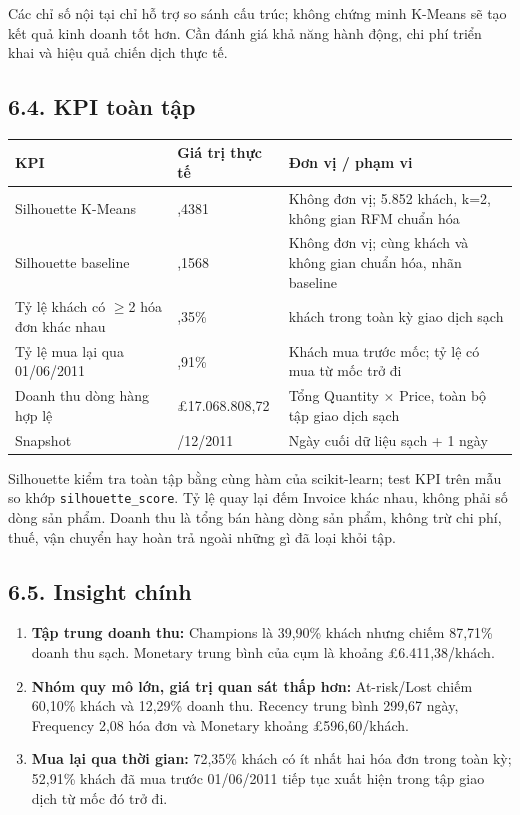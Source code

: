 \documentclass[a4paper]{article}
\begin{document}
Các chỉ số nội tại chỉ hỗ trợ so sánh cấu trúc; không chứng minh K-Means sẽ tạo kết quả kinh doanh tốt hơn. Cần đánh giá khả năng hành động, chi phí triển khai và hiệu quả chiến dịch thực tế.

\subsection*{6.4. KPI toàn tập}

\begin{table}[htbp]
\centering
\small
\begin{tabularx}{\textwidth}{|>{\raggedright\arraybackslash}X|>{\raggedright\arraybackslash}X|>{\raggedright\arraybackslash}X|}
\hline
\textbf{KPI} & \textbf{Giá trị thực tế} & \textbf{Đơn vị / phạm vi} \\
\hline
Silhouette K-Means & 0,4381 & Không đơn vị; 5.852 khách, k=2, không gian RFM chuẩn hóa \\
\hline
Silhouette baseline & 0,1568 & Không đơn vị; cùng khách và không gian chuẩn hóa, nhãn baseline \\
\hline
Tỷ lệ khách có \ensuremath{\geq}2 hóa đơn khác nhau & 72,35\% & 5.852 khách trong toàn kỳ giao dịch sạch \\
\hline
Tỷ lệ mua lại qua 01/06/2011 & 52,91\% & Khách mua trước mốc; tỷ lệ có mua từ mốc trở đi \\
\hline
Doanh thu dòng hàng hợp lệ & \pounds{}17.068.808,72 & Tổng Quantity \ensuremath{\times} Price, toàn bộ tập giao dịch sạch \\
\hline
Snapshot & 10/12/2011 & Ngày cuối dữ liệu sạch + 1 ngày \\
\hline
\end{tabularx}
\end{table}


Silhouette kiểm tra toàn tập bằng cùng hàm của scikit-learn; test KPI trên mẫu so khớp \texttt{silhouette\_score}. Tỷ lệ quay lại đếm Invoice khác nhau, không phải số dòng sản phẩm. Doanh thu là tổng bán hàng dòng sản phẩm, không trừ chi phí, thuế, vận chuyển hay hoàn trả ngoài những gì đã loại khỏi tập.

\subsection*{6.5. Insight chính}

\begin{enumerate}
\item \textbf{Tập trung doanh thu:} Champions là 39,90\% khách nhưng chiếm 87,71\% doanh thu sạch. Monetary trung bình của cụm là khoảng \pounds{}6.411,38/khách.
\item \textbf{Nhóm quy mô lớn, giá trị quan sát thấp hơn:} At-risk/Lost chiếm 60,10\% khách và 12,29\% doanh thu. Recency trung bình 299,67 ngày, Frequency 2,08 hóa đơn và Monetary khoảng \pounds{}596,60/khách.
\item \textbf{Mua lại qua thời gian:} 72,35\% khách có ít nhất hai hóa đơn trong toàn kỳ; 52,91\% khách đã mua trước 01/06/2011 tiếp tục xuất hiện trong tập giao dịch từ mốc đó trở đi.
\end{enumerate}
\end{document}
